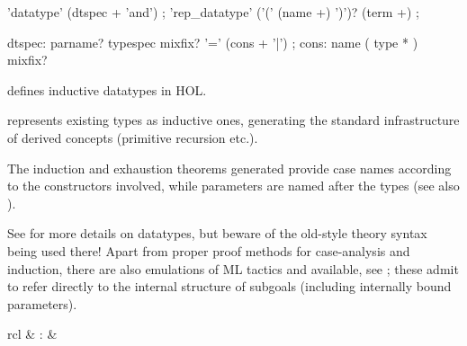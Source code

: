 \begin{isabellebody}
\begin{isamarkuptext}
  \begin{rail}
    'datatype' (dtspec + 'and')
    ;
    'rep_datatype' ('(' (name +) ')')? (term +)
    ;

    dtspec: parname? typespec mixfix? '=' (cons + '|')
    ;
    cons: name ( type * ) mixfix?
  \end{rail}

  \begin{description}

  \item \hyperlink{command.HOL.datatype}{\mbox{}} defines inductive datatypes in
  HOL.

  \item \hyperlink{command.HOL.rep-datatype}{\mbox{}} represents existing types as
  inductive ones, generating the standard infrastructure of derived
  concepts (primitive recursion etc.).

  \end{description}

  The induction and exhaustion theorems generated provide case names
  according to the constructors involved, while parameters are named
  after the types (see also ).

  See \cite{isabelle-HOL} for more details on datatypes, but beware of
  the old-style theory syntax being used there!  Apart from proper
  proof methods for case-analysis and induction, there are also
  emulations of ML tactics \hyperlink{method.HOL.case-tac}{\mbox{}} and \hyperlink{method.HOL.induct-tac}{\mbox{}} available, see ; these admit
  to refer directly to the internal structure of subgoals (including
  internally bound parameters).%
\end{isamarkuptext}%
\isamarkuptrue%
%
\isamarkuptrue%
%
\begin{isamarkuptext}%
\begin{matharray}{rcl}
    \hypertarget{command.HOL.enriched-type}{\hyperlink{command.HOL.enriched-type}{\mbox{}}} & : & 
  \end{matharray}


\end{isamarkuptext}
\end{isabellebody}

